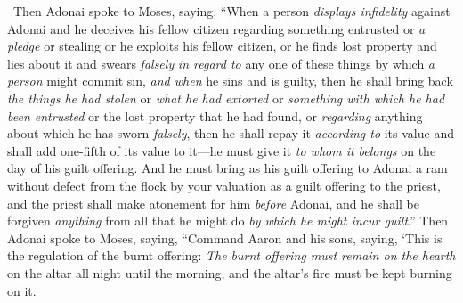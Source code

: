 \begin{biblechapter} %
  Then Adonai spoke to Moses, saying,
\verse “When a person \textit{displays infidelity} against Adonai and he deceives his fellow citizen regarding something entrusted or \textit{a pledge} or stealing or he exploits his fellow citizen,
\verse or he finds lost property and lies about it and swears \textit{falsely} \textit{in regard to} any one of these things by which \textit{a person} might commit sin,
\verse \textit{and when} he sins and is guilty, then he shall bring back \textit{the things he had stolen} or \textit{what he had extorted} or \textit{something with which he had been entrusted} or the lost property that he had found,
\verse or \textit{regarding} anything about which he has sworn \textit{falsely}, then he shall repay it \textit{according to} its value and shall add one-fifth of its value to it—he must give it \textit{to whom it belongs} on the day of his guilt offering.
\verse And he must bring as his guilt offering to Adonai a ram without defect from the flock by your valuation as a guilt offering to the priest,
\verse and the priest shall make atonement for him \textit{before} Adonai, and he shall be forgiven \textit{anything} from all that he might do \textit{by which he might incur guilt}.”
\verse Then Adonai spoke to Moses, saying,
\verse “Command Aaron and his sons, saying, ‘This is the regulation of the burnt offering: \textit{The burnt offering must remain on the hearth} on the altar all night until the morning, and the altar’s fire must be kept burning on it.

\end{biblechapter}
